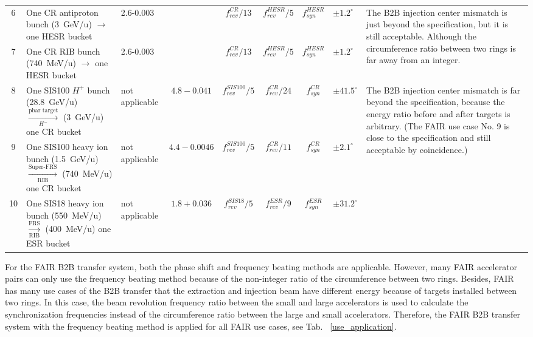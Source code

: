 \begin{table}
\begin{center}
\begin{tabular}{| c | p{3cm} | p{1.5cm} | c | c | c | c | p{1.3cm} |p{4cm} |}
6&One CR antiproton bunch (\SI{3}{GeV/u}) $\rightarrow$ one HESR bucket	 &2.6-0.003 & &$f_\mathit{rev}^\mathit{CR}/13$ &$f_\mathit{rev}^\mathit{HESR}/5$ &$f_\mathit{syn}^\mathit{HESR}$ &$\pm1.2^\circ$& \multirow{2}{*}{\parbox{4cm}{The B2B injection center mismatch is just beyond the specification, but it is still acceptable. Although the circumference ratio between two rings is far away from an integer.}}\\ \cline{1-8}
\rule{0pt}{25pt}7&One CR RIB bunch (\SI{740}{MeV/u}) $\rightarrow$ one HESR bucket	&2.6-0.003 & &$f_\mathit{rev}^\mathit{CR}/13$ &$f_\mathit{rev}^\mathit{HESR}/5$ &$f_\mathit{syn}^\mathit{HESR}$ &$\pm1.2^\circ$ &\\ \hline
8&One SIS100 $H^{+}$ bunch (\SI{28.8}{GeV/u}) $\xrightarrow[\text{$H^{-}$}]{\text{pbar target}}$ (\SI{3}{GeV/u}) one CR bucket  & not applicable &$4.8-0.041$&$f_\mathit{rev}^\mathit{SIS100}/5$ &$f_\mathit{rev}^\mathit{CR}/24$ &$f_\mathit{syn}^\mathit{CR}$ &$\pm41.5^\circ$& \multirow{5}{*}{\parbox{4cm}{The B2B injection center mismatch is far beyond the specification, because the energy ratio before and after targets is arbitrary. (The FAIR use case No. 9 is close to the specification and still acceptable by coincidence.)}}\\ \cline{1-8}
9&One SIS100 heavy ion bunch (\SI{1.5}{GeV/u}) $\xrightarrow[\text{RIB}]{\text{Super-FRS}}$ (\SI{740}{MeV/u}) one CR bucket 	&	not applicable &$4.4-0.0046$&$f_\mathit{rev}^\mathit{SIS100}/5$ &$f_\mathit{rev}^\mathit{CR}/11$ &$f_\mathit{syn}^\mathit{CR}$ &$\pm2.1^\circ$	& \\ \cline{1-8}

10&One SIS18 heavy ion bunch (\SI{550}{MeV/u}) $\xrightarrow[\text{RIB}]{\text{FRS}}$ (\SI{400}{MeV/u}) one ESR bucket & not applicable &$1.8+0.036$&$f_\mathit{rev}^\mathit{SIS18}/5$ &$f_\mathit{rev}^\mathit{ESR}/9$ &$f_\mathit{syn}^\mathit{ESR}$ &	$\pm31.2^\circ$	&\\ \hline

    \end{tabular}
\end{center}
\end{table}

For the FAIR B2B transfer system, both the phase shift and frequency beating methods are applicable. However, many FAIR accelerator pairs can only use the frequency beating method because of the non-integer ratio of the circumference between two rings. Besides, FAIR has many use cases of the B2B transfer that the extraction and injection beam have different energy because of targets installed between two rings. In this case, the beam revolution frequency ratio between the small and large accelerators is used to calculate the synchronization frequencies instead of the circumference ratio between the large and small accelerators. Therefore, the FAIR B2B transfer system with the frequency beating method is applied for all FAIR use cases, see Tab. ~\ref{use_application}.

